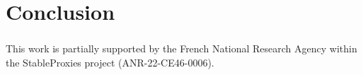 \documentclass[runningheads]{llncs}
\begin{document}


    \section{Conclusion}


    \begin{credits}
        \subsubsection{\ackname}
        This work is partially supported by the French National Research Agency
        within the StableProxies project (ANR-22-CE46-0006).
    \end{credits}
%
%
%
    
    
\end{document}
